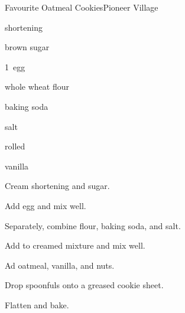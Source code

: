 \begin{recipe}{Favourite Oatmeal Cookies\FIXME}{Pioneer Village}{}

\begin{ingredients}
\item {} shortening
\item {} brown sugar
\item 1~egg
\item \C{1\half} whole wheat flour
\item {} baking soda
\item \tp{\quarter} salt
\item \C{1\half} rolled 
\item {} vanilla
\item \C{\quarter} 
\end{ingredients}

\begin{directions}
\item Cream shortening and sugar.
\item Add egg and mix well.
\item Separately, combine flour, baking soda, and salt.
\item Add to creamed mixture and mix well.
\item Ad oatmeal, vanilla, and nuts.
\item Drop spoonfuls onto a greased cookie sheet.
\item Flatten and bake.
\end{directions}

\end{recipe}
